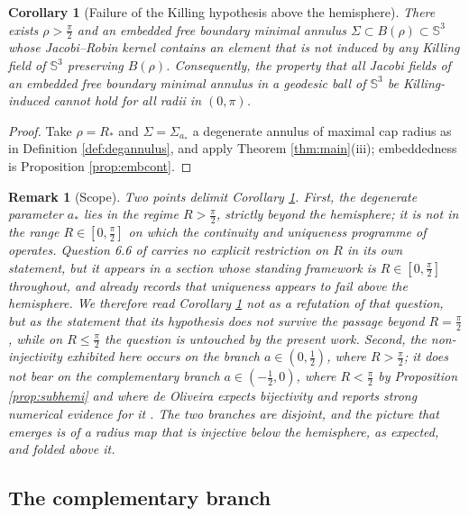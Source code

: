 \documentclass[10pt,a4paper]{amsart}
\newtheorem{corollary}[theorem]{Corollary}
\newtheorem{remark}[theorem]{Remark}
\newcommand{\Sph}{\mathbb{S}}
\begin{document}
\begin{corollary}[Failure of the Killing hypothesis above the hemisphere]\label{cor:Q66}
There exists $\rho>\tfrac\pi2$ and an embedded free boundary minimal annulus $\Sigma\subset B(\rho)\subset\Sph^3$ whose Jacobi--Robin kernel contains an element that is not induced by any Killing field of $\Sph^3$ preserving $B(\rho)$. Consequently, the property that all Jacobi fields of an embedded free boundary minimal annulus in a geodesic ball of $\Sph^3$ be Killing-induced cannot hold for all radii in $(0,\pi)$.
\end{corollary}

\begin{proof}
Take $\rho=R_*$ and $\Sigma=\Sigma_{a_*}$ a degenerate annulus of maximal cap radius as in Definition \ref{def:degannulus}, and apply Theorem \ref{thm:main}(iii); embeddedness is Proposition \ref{prop:embcont}.
\end{proof}

\begin{remark}[Scope]\label{rem:scope}
Two points delimit Corollary \ref{cor:Q66}. First, the degenerate parameter $a_*$ lies in the regime $R>\tfrac\pi2$, strictly beyond the hemisphere; it is not in the range $R\in[0,\tfrac\pi2]$ on which the continuity and uniqueness programme of \cite[\S 6]{NZ1} operates. Question 6.6 of \cite{NZ1} carries no explicit restriction on $R$ in its own statement, but it appears in a section whose standing framework is $R\in[0,\tfrac\pi2]$ throughout, and \cite[Rem. 1.3]{NZ1} already records that uniqueness appears to fail above the hemisphere. We therefore read Corollary \ref{cor:Q66} not as a refutation of that question, but as the statement that its hypothesis does not survive the passage beyond $R=\tfrac\pi2$, while on $R\leq\tfrac\pi2$ the question is untouched by the present work. Second, the non-injectivity exhibited here occurs on the branch $a\in(0,\tfrac12)$, where $R>\tfrac\pi2$; it does not bear on the complementary branch $a\in(-\tfrac12,0)$, where $R<\tfrac\pi2$ by Proposition \ref{prop:subhemi} and where de Oliveira expects bijectivity and reports strong numerical evidence for it \cite[Rem. 3.5]{dO24}. The two branches are disjoint, and the picture that emerges is of a radius map that is injective below the hemisphere, as expected, and folded above it.
\end{remark}

\subsection*{The complementary branch}
\end{document}
